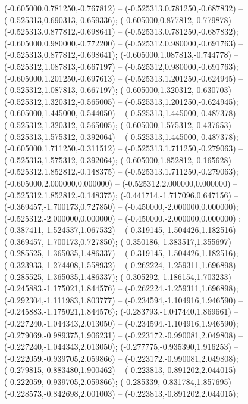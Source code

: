  (-0.605000,0.781250,-0.767812) -- (-0.525313,0.781250,-0.687832) -- (-0.525313,0.690313,-0.659336);
 (-0.605000,0.877812,-0.779878) -- (-0.525313,0.877812,-0.698641) -- (-0.525313,0.781250,-0.687832);
 (-0.605000,0.980000,-0.772200) -- (-0.525312,0.980000,-0.691763) -- (-0.525313,0.877812,-0.698641);
 (-0.605000,1.087813,-0.744778) -- (-0.525312,1.087813,-0.667197) -- (-0.525312,0.980000,-0.691763);
 (-0.605000,1.201250,-0.697613) -- (-0.525313,1.201250,-0.624945) -- (-0.525312,1.087813,-0.667197);
 (-0.605000,1.320312,-0.630703) -- (-0.525312,1.320312,-0.565005) -- (-0.525313,1.201250,-0.624945);
 (-0.605000,1.445000,-0.544050) -- (-0.525313,1.445000,-0.487378) -- (-0.525312,1.320312,-0.565005);
 (-0.605000,1.575312,-0.437653) -- (-0.525313,1.575312,-0.392064) -- (-0.525313,1.445000,-0.487378);
 (-0.605000,1.711250,-0.311512) -- (-0.525313,1.711250,-0.279063) -- (-0.525313,1.575312,-0.392064);
 (-0.605000,1.852812,-0.165628) -- (-0.525312,1.852812,-0.148375) -- (-0.525313,1.711250,-0.279063);
 (-0.605000,2.000000,0.000000) -- (-0.525312,2.000000,0.000000) -- (-0.525312,1.852812,-0.148375);
 (-0.441714,-1.717096,0.647156) -- (-0.369457,-1.700173,0.727850) -- (-0.450000,-2.000000,0.000000);
 (-0.525312,-2.000000,0.000000) -- (-0.450000,-2.000000,0.000000) ;
 (-0.387411,-1.524537,1.067532) -- (-0.319145,-1.504426,1.182516) -- (-0.369457,-1.700173,0.727850);
 (-0.350186,-1.383517,1.355697) -- (-0.285525,-1.365035,1.486337) -- (-0.319145,-1.504426,1.182516);
 (-0.323933,-1.274408,1.558932) -- (-0.262224,-1.259311,1.696898) -- (-0.285525,-1.365035,1.486337);
 (-0.305292,-1.186154,1.703233) -- (-0.245883,-1.175021,1.844576) -- (-0.262224,-1.259311,1.696898);
 (-0.292304,-1.111983,1.803777) -- (-0.234594,-1.104916,1.946590) -- (-0.245883,-1.175021,1.844576);
 (-0.283793,-1.047440,1.869661) -- (-0.227240,-1.044343,2.013050) -- (-0.234594,-1.104916,1.946590);
 (-0.279069,-0.989375,1.906231) -- (-0.223172,-0.990081,2.049808) -- (-0.227240,-1.044343,2.013050);
 (-0.277775,-0.935390,1.916253) -- (-0.222059,-0.939705,2.059866) -- (-0.223172,-0.990081,2.049808);
 (-0.279815,-0.883480,1.900462) -- (-0.223813,-0.891202,2.044015) -- (-0.222059,-0.939705,2.059866);
 (-0.285339,-0.831784,1.857695) -- (-0.228573,-0.842698,2.001003) -- (-0.223813,-0.891202,2.044015);
